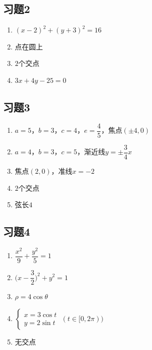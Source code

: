\documentclass[a4paper,12pt]{ctexart}
\begin{document}
\subsection*{习题2}
\begin{enumerate}
  \item $(x-2)^2+(y+3)^2=16$
  \item 点在圆上
  \item $2$个交点
  \item $3x+4y-25=0$
\end{enumerate}

\subsection*{习题3}
\begin{enumerate}
  \item $a=5$，$b=3$，$c=4$，$e=\dfrac45$，焦点$(\pm4,0)$
  \item $a=4$，$b=3$，$c=5$，渐近线$y=\pm\dfrac34x$
  \item 焦点$(2,0)$，准线$x=-2$
  \item $2$个交点
  \item 弦长$4$
\end{enumerate}

\subsection*{习题4}
\begin{enumerate}
  \item $\dfrac{x^2}{9}+\dfrac{y^2}{5}=1$
  \item $\bigl(x-\dfrac32\bigr)^2+y^2=1$
  \item $\rho=4\cos\theta$
  \item $\begin{cases}x=3\cos t\\y=2\sin t\end{cases}\;(t\in[0,2\pi))$
  \item 无交点
\end{enumerate}
\end{document}
